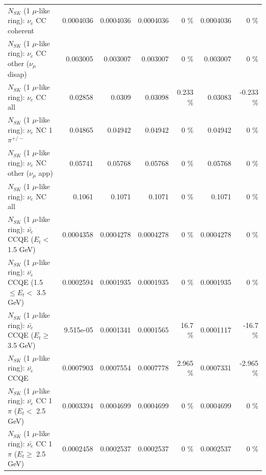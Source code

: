 \begin{table}
\begin{tabular}{| l | r | r | r  r | r  r |}
                               $N_{SK}$ (1 $\mu$-like ring): $\nu_e$ CC coherent &       0.0004036 &       0.0004036 &       0.0004036 &        0 \%  &       0.0004036 &        0 \%  \\ 
                $N_{SK}$ (1 $\mu$-like ring): $\nu_e$ CC other ($\nu_\mu$ disap) &        0.003005 &        0.003007 &        0.003007 &        0 \%  &        0.003007 &        0 \%  \\ 
                                  $N_{SK}$ (1 $\mu$-like ring): $\nu_{e}$ CC all &         0.02858 &          0.0309 &         0.03098 &    0.233 \%  &         0.03083 &   -0.233 \%  \\ 
\hline
                           $N_{SK}$ (1 $\mu$-like ring): $\nu_e$ NC 1$\pi^{+/-}$ &         0.04865 &         0.04942 &         0.04942 &        0 \%  &         0.04942 &        0 \%  \\ 
                  $N_{SK}$ (1 $\mu$-like ring): $\nu_e$ NC other ($\nu_\mu$ app) &         0.05741 &         0.05768 &         0.05768 &        0 \%  &         0.05768 &        0 \%  \\ 
                                  $N_{SK}$ (1 $\mu$-like ring): $\nu_{e}$ NC all &          0.1061 &          0.1071 &          0.1071 &        0 \%  &          0.1071 &        0 \%  \\ 
\hline
\hline
\hline
            $N_{SK}$ (1 $\mu$-like ring): $\bar{\nu_e}$ CCQE ($E_{t} <$ 1.5 GeV) &       0.0004358 &       0.0004278 &       0.0004278 &        0 \%  &       0.0004278 &        0 \%  \\ 
   $N_{SK}$ (1 $\mu$-like ring): $\bar{\nu_e}$ CCQE (1.5 $\leq E_{t} <$ 3.5 GeV) &       0.0002594 &       0.0001935 &       0.0001935 &        0 \%  &       0.0001935 &        0 \%  \\ 
         $N_{SK}$ (1 $\mu$-like ring): $\bar{\nu_e}$ CCQE ($E_{t} \geq$ 3.5 GeV) &       9.515e-05 &       0.0001341 &       0.0001565 &     16.7 \%  &       0.0001117 &    -16.7 \%  \\ 
\hline
                                $N_{SK}$ (1 $\mu$-like ring): $\bar{\nu_e}$ CCQE &       0.0007903 &       0.0007554 &       0.0007778 &    2.965 \%  &       0.0007331 &   -2.965 \%  \\ 
\hline
       $N_{SK}$ (1 $\mu$-like ring): $\bar{\nu_e}$ CC 1$\pi$ ($E_{t} <$ 2.5 GeV) &       0.0003394 &       0.0004699 &       0.0004699 &        0 \%  &       0.0004699 &        0 \%  \\ 
    $N_{SK}$ (1 $\mu$-like ring): $\bar{\nu_e}$ CC 1$\pi$ ($E_{t} \geq$ 2.5 GeV) &       0.0002458 &       0.0002537 &       0.0002537 &        0 \%  &       0.0002537 &        0 \%  \\ 

\end{tabular}
\end{table}
